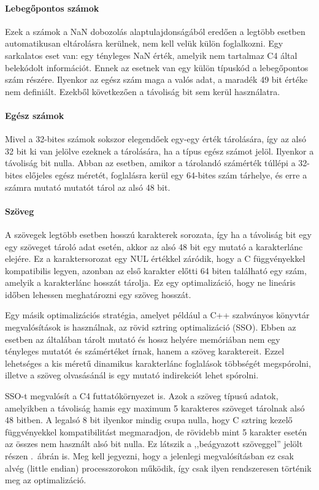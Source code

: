 \paragraph{Lebegőpontos számok} Ezek a számok a \gls{NaN} dobozolás alaptulajdonságából eredően a legtöbb esetben automatikusan eltárolásra kerülnek, nem kell velük külön foglalkozni.
Egy sarkalatos eset van: egy tényleges \gls{NaN} érték, amelyik nem tartalmaz C4 által belekódolt információt.
Ennek az esetnek van egy külön típuskód a lebegőpontos szám részére.
Ilyenkor az egész szám maga a valós adat, a maradék 49 bit értéke nem definiált.
Ezekből következően a távoliság bit sem kerül használatra.

\paragraph{Egész számok} Mivel a 32-bites számok sokszor elegendőek egy-egy érték tárolására, így az alsó 32 bit ki van jelölve ezeknek a tárolására, ha a típus egész számot jelöl.
Ilyenkor a távoliság bit nulla.
Abban az esetben, amikor a tárolandó számérték túllépi a 32-bites előjeles egész méretét, foglalásra kerül egy 64-bites szám tárhelye, és erre a számra mutató mutatót tárol az alsó 48 bit.

\paragraph{Szöveg} A szövegek legtöbb esetben hosszú karakterek sorozata, így ha a távoliság bit egy egy szöveget tároló adat esetén, akkor az alsó 48 bit egy mutató a karakterlánc elejére.
Ez a karaktersorozat egy  NUL értékkel záródik, hogy a C függvényekkel kompatibilis legyen, azonban az első karakter előtti 64 biten található egy szám, amelyik a karakterlánc hosszát tárolja.
Ez egy optimalizáció, hogy ne lineáris időben lehessen meghatározni egy szöveg hosszát.

Egy másik optimalizációs stratégia, amelyet például a C++ szabványos könyvtár megvalósítások is használnak, az \un rövid sztring optimalizáció (\gls{SSO}).
Ebben az esetben az általában tárolt mutató és hossz helyére memóriában nem egy tényleges mutatót és számértéket írnak, hanem a szöveg karaktereit.
Ezzel lehetséges a kis méretű dinamikus karakterlánc foglalások többségét megspórolni, illetve a szöveg olvasásánál is egy mutató indirekciót lehet spórolni.

\gls{SSO}-t megvalósít a C4 futtatókörnyezet is.
Azok a szöveg típusú adatok, amelyikben a távoliság hamis egy maximum 5 karakteres szöveget tárolnak alsó 48 bitben.
A legalsó 8 bit ilyenkor mindig csupa nulla, hogy C sztring kezelő függvényekkel kompatibilitást megmaradjon, de rövidebb mint 5 karakter esetén az összes nem használt alsó bit nulla.
Ez látszik a ,,beágyazott szöveggel'' jelölt részen .~ábrán is.
Meg kell jegyezni, hogy a jelenlegi megvalósításban ez csak alvég (little endian) processzorokon működik, így csak ilyen rendszeresen történik meg az optimalizáció.

